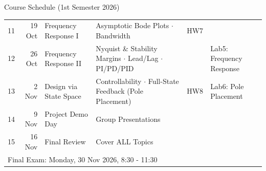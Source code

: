 \documentclass[12pt, aspectratio=169]{beamer}
\begin{document}
\begin{frame}{Course Schedule (1st Semester 2026)}
\begin{tabular}{r|r|l|l|c|l}
    11 & 19 Oct & Frequency Response I & Asymptotic Bode Plots $\cdot$ Bandwidth & HW7 & \\
    12 & 26 Oct & Frequency Response II & Nyquist \& Stability Margins $\cdot$ Lead/Lag $\cdot$ PI/PD/PID & &  Lab5: Frequency Response\\
    13 & 2 Nov & Design via State Space & Controllability $\cdot$ Full-State Feedback (Pole Placement) & HW8 & Lab6: Pole Placement\\
    14 & 9 Nov & Project Demo Day & Group Presentations & \\
    15 & 16 Nov & Final Review & Cover ALL Topics& \\
    \midrule
    \multicolumn{6}{l}{Final Exam: Monday, 30 Nov 2026, 8:30 - 11:30} \\

\end{tabular}
\end{frame}
\end{document}
